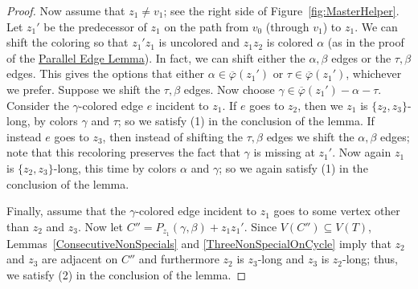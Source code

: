 \documentclass[12pt]{article}
\theoremstyle{plain}
\theoremstyle{definition}
\theoremstyle{remark}
\newcommand{\vphn}{\overline{\varphi}}
\begin{document}
\begin{proof}
Now assume that $z_1\ne v_1$; see the right side of
Figure~\ref{fig:MasterHelper}.
Let $z_1'$ be the predecessor of $z_1$ on the path from $v_0$ (through $v_1$) to
$z_1$.  We can shift the coloring so that $z_1'z_1$ is uncolored and $z_1z_2$
is colored $\alpha$ (as in the proof of the \hyperref[SpecialPath]{Parallel
Edge Lemma}).  In fact, 
we can shift either the $\alpha,\beta$ edges or the $\tau,\beta$ edges.  This
gives the options that either $\alpha\in \vphn(z_1')$ or $\tau\in \vphn(z_1')$,
whichever we prefer.  Suppose we shift the $\tau,\beta$ edges.
Now choose $\gamma\in \vphn(z_1')-\alpha-\tau$.  Consider
the $\gamma$-colored edge $e$ incident to $z_1$.  If $e$ goes to $z_2$, then we
$z_1$ is $\{z_2,z_3\}$-long, by colors $\gamma$ and $\tau$; so we satisfy (1) in
the conclusion of the lemma.
If instead $e$ goes to $z_3$, then instead of shifting the $\tau,\beta$ edges we
shift the $\alpha,\beta$ edges; note that this recoloring preserves the fact
that $\gamma$ is missing at $z_1'$.  Now again $z_1$ is $\{z_2,z_3\}$-long, this
time by colors $\alpha$ and $\gamma$; so we again satisfy (1) in the conclusion
of the lemma.

Finally, assume that the $\gamma$-colored edge incident to $z_1$ goes to some
vertex other than $z_2$ and $z_3$.  Now let $C''=P_{z_1}(\gamma,\beta)+z_1z_1'$.
Since $V(C'')\subseteq V(T)$, Lemmas~\ref{ConsecutiveNonSpecials} and
\ref{ThreeNonSpecialOnCycle} imply that $z_2$ and $z_3$ are
adjacent on $C''$ and furthermore $z_2$ is $z_3$-long and $z_3$ is $z_2$-long;
thus, we satisfy (2) in the conclusion of the lemma.
\end{proof}
\end{document}

